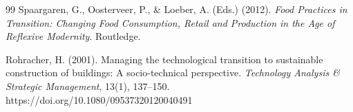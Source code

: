 \documentclass[review]{elsarticle}
\begin{document}
\begin{thebibliography}{99}
Spaargaren, G., Oosterveer, P., \& Loeber, A. (Eds.) (2012). \textit{Food Practices in Transition: Changing Food Consumption, Retail and Production in the Age of Reflexive Modernity}. Routledge.

Rohracher, H. (2001). Managing the technological transition to sustainable construction of buildings: A socio-technical perspective. \textit{Technology Analysis \& Strategic Management}, 13(1), 137--150. https://doi.org/10.1080/09537320120040491

\end{thebibliography}
\end{document}
